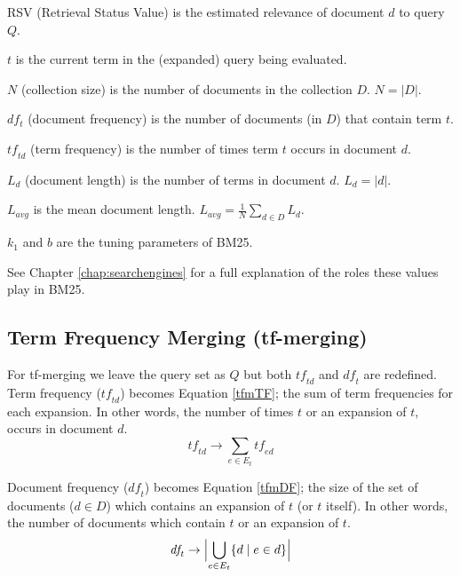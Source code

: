 \noindent
RSV (Retrieval Status Value) is the estimated relevance of document $d$ to query $Q$.

\noindent
$t$ is the current term in the (expanded) query being evaluated.

\noindent
$N$ (collection size) is the number of documents in the collection $D$. $N = |D|$.

\noindent
$df_t$ (document frequency) is the number of documents (in $D$) that contain term $t$.

\noindent
$\mathit{tf}_{\!td}$ (term frequency) is the number of times term $t$ occurs in document $d$.

\noindent
$L_d$ (document length) is the number of terms in document $d$. $L_d = |d|$.

\noindent
$L_{avg}$ is the mean document length. $L_{avg} = \frac{1}{N}\sum_{d \in D} L_d $.

\noindent
$k_1$ and $b$ are the tuning parameters of BM25.

\noindent
See Chapter \ref{chap:searchengines} for a full explanation of the roles these values play in BM25.

\newpage
\subsection{Term Frequency Merging (tf-merging)}
For tf-merging we leave the query set as $Q$ but both $\mathit{tf}_{\!td}$ and $\mathit{df}_{\!t}$ are redefined.
Term frequency ($\mathit{tf}_{\!td}$) becomes Equation \eqref{tfmTF}; the sum of term frequencies for each expansion. In other words, the number of times $t$ or an expansion of $t$, occurs in document $d$.
\begin{equation}\label{tfmTF}
	\mathit{tf}_{\!td} \rightarrow \sum_{e \in E_t} \mathit{tf}_{\!ed}
\end{equation}

Document frequency ($\mathit{df}_{\!t}$) becomes Equation \eqref{tfmDF}; the size of the set of documents ($d \in D$) which contains an expansion of $t$ (or $t$ itself). In other words, the number of documents which contain $t$ or an expansion of $t$.
\begin{equation}\label{tfmDF}
	\mathit{df}_{\!t} \rightarrow \Bigl| \bigcup_{e \in E_t} \{ d \mid e \in d \} \Bigr|
\end{equation}


